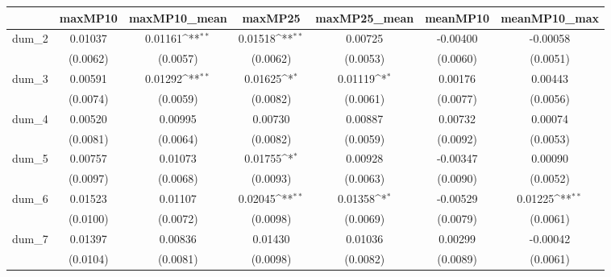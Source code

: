 {
\def\sym#1{\ifmmode^{#1}\else\(^{#1}\)\fi}
\begin{tabular}{l*{6}{c}}
\toprule
            &\multicolumn{1}{c}{maxMP10}&\multicolumn{1}{c}{maxMP10\_mean}&\multicolumn{1}{c}{maxMP25}&\multicolumn{1}{c}{maxMP25\_mean}&\multicolumn{1}{c}{meanMP10}&\multicolumn{1}{c}{meanMP10\_max}\\
\midrule
dum\_2       &     0.01037         &     0.01161\sym{**} &     0.01518\sym{**} &     0.00725         &    -0.00400         &    -0.00058         \\
            &    (0.0062)         &    (0.0057)         &    (0.0062)         &    (0.0053)         &    (0.0060)         &    (0.0051)         \\
dum\_3       &     0.00591         &     0.01292\sym{**} &     0.01625\sym{*}  &     0.01119\sym{*}  &     0.00176         &     0.00443         \\
            &    (0.0074)         &    (0.0059)         &    (0.0082)         &    (0.0061)         &    (0.0077)         &    (0.0056)         \\
dum\_4       &     0.00520         &     0.00995         &     0.00730         &     0.00887         &     0.00732         &     0.00074         \\
            &    (0.0081)         &    (0.0064)         &    (0.0082)         &    (0.0059)         &    (0.0092)         &    (0.0053)         \\
dum\_5       &     0.00757         &     0.01073         &     0.01755\sym{*}  &     0.00928         &    -0.00347         &     0.00090         \\
            &    (0.0097)         &    (0.0068)         &    (0.0093)         &    (0.0063)         &    (0.0090)         &    (0.0052)         \\
dum\_6       &     0.01523         &     0.01107         &     0.02045\sym{**} &     0.01358\sym{*}  &    -0.00529         &     0.01225\sym{**} \\
            &    (0.0100)         &    (0.0072)         &    (0.0098)         &    (0.0069)         &    (0.0079)         &    (0.0061)         \\
dum\_7       &     0.01397         &     0.00836         &     0.01430         &     0.01036         &     0.00299         &    -0.00042         \\
            &    (0.0104)         &    (0.0081)         &    (0.0098)         &    (0.0082)         &    (0.0089)         &    (0.0061)         \\

\end{tabular}}

